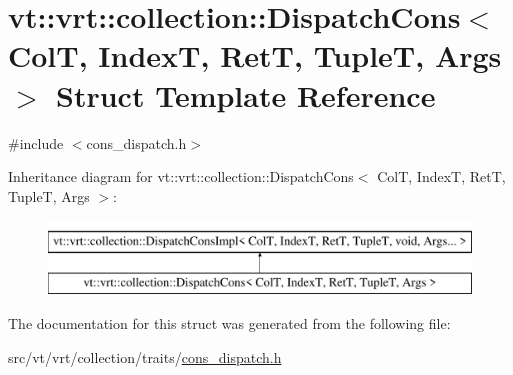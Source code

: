 \hypertarget{structvt_1_1vrt_1_1collection_1_1_dispatch_cons}{}\section{vt\+:\+:vrt\+:\+:collection\+:\+:Dispatch\+Cons$<$ ColT, IndexT, RetT, TupleT, Args $>$ Struct Template Reference}
\label{structvt_1_1vrt_1_1collection_1_1_dispatch_cons}


{\ttfamily \#include $<$cons\+\_\+dispatch.\+h$>$}

Inheritance diagram for vt\+:\+:vrt\+:\+:collection\+:\+:Dispatch\+Cons$<$ ColT, IndexT, RetT, TupleT, Args $>$\+:\begin{figure}[H]
\begin{center}
\leavevmode
\includegraphics[height=2.000000cm]{structvt_1_1vrt_1_1collection_1_1_dispatch_cons}
\end{center}
\end{figure}


The documentation for this struct was generated from the following file\+:\begin{DoxyCompactItemize}
\item 
src/vt/vrt/collection/traits/\hyperlink{cons__dispatch_8h}{cons\+\_\+dispatch.\+h}\end{DoxyCompactItemize}
